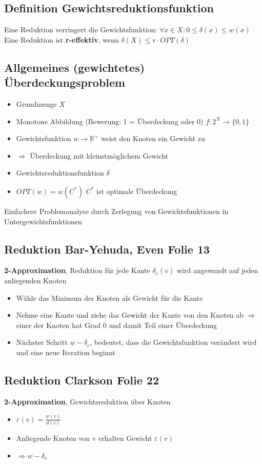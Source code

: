 \documentclass[ngerman]{scrartcl}
\begin{document}
\subsection{Definition Gewichtsreduktionsfunktion}
Eine Reduktion verringert die Gewichtsfunktion: $ \forall x \in X : 0 \leq \delta(x) \leq w(x) $ \\
Eine Reduktion ist \textbf{r-effektiv}, wenn $ \delta(X) \leq r \cdot  OPT(\delta) $
\subsection{Allgemeines (gewichtetes) Überdeckungsproblem}
\begin{itemize}
  \item Grundmenge $ X $
  \item Monotone Abbildung (Bewerung: 1 = Überdeckung oder 0) $ f: 2^X \rightarrow \{0,1\} $
  \item Gewichtsfunktion $ w \rightarrow \mathbb{R}^+ $ weist den Knoten ein Gewicht zu
  \item $ \Rightarrow $ Überdeckung mit kleinstmöglichem Gewicht
  \item Gewichtsreduktionsfunktion $ \delta $
  \item $ OPT(w) = w(C^*) $ $ C^* $ ist optimale Überdeckung
\end{itemize}
Einfachere Problemanalyse durch Zerlegung von Gewichtsfunktionen in Untergewichtsfunktionen

\subsection{Reduktion Bar-Yehuda, Even Folie 13}
\textbf{2-Approximation}, Reduktion für jede Kante $ \delta_e (v) $ wird angewandt auf jeden anliegenden Knoten
\begin{itemize}
  \item Wähle das Minimum der Knoten als Gewicht für die Kante
  \item Nehme eine Kante und ziehe das Gewicht der Kante von den Knoten ab $ \Rightarrow $ einer der Knoten hat Grad 0 und damit Teil einer Überdeckung
  \item Nächster Schritt $ w - \delta_e $, bedeutet, dass die Gewichtsfunktion verändert wird und eine neue Iteration beginnt
\end{itemize}

\subsection{Reduktion Clarkson Folie 22}
\textbf{2-Approximation}, Gewichtsreduktion über Knoten
\begin{itemize}
  \item $ \varepsilon (v) = \frac{w(v)}{d(v)}$
  \item Anliegende Knoten von v erhalten Gewicht $ \varepsilon(v) $
  \item $ \Rightarrow w - \delta_v $
\end{itemize} 
\end{document}
